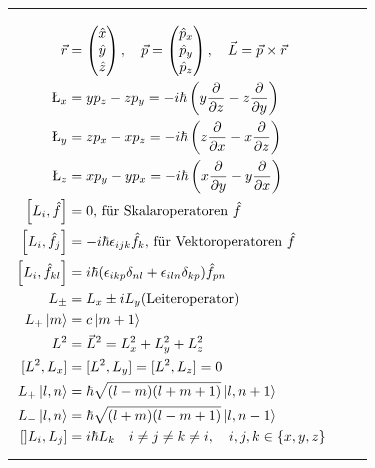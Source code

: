 \documentclass[landscape,8pt]{scrartcl}
\newcommand{\myheading}[1]{\noindent\textbf{#1}\\}
\begin{document}
\begin{tabular}{lll}
\begin{minipage}{0.3\linewidth}
\myheading{Drehimpuls}
{\begin{align*}
\vec r 	&= \begin{pmatrix}\hat x\\\hat y\\\hat z\end{pmatrix},
\quad \vec p 	= \begin{pmatrix}\hat p_x\\\hat p_y\\\hat p_z\end{pmatrix},
\quad \vec L = \vec p \times \vec r \\
%
\L_x 	&= yp_z - zp_y = -i\hbar \left( y\frac{\partial}{\partial z}-z\frac{\partial}{\partial y}\right) \\
%
\L_y 	&= zp_x - xp_z = -i\hbar \left( z\frac{\partial}{\partial x}-x\frac{\partial}{\partial z}\right) \\
%
\L_z 	&= xp_y - yp_x = -i\hbar \left( x\frac{\partial}{\partial y}-y\frac{\partial}{\partial x}\right)\\
\left[L_i,\hat f\right] &= 0 \text{, für Skalaroperatoren $\hat f$} \\
\left[L_i,\hat f_j\right] &= -i\hbar \epsilon_{ijk}\hat f_k \text{, für Vektoroperatoren $\hat f$} \\
\left[L_i,\hat f_{kl}\right] &= i\hbar (\epsilon_{ikp}\delta_{nl}+\epsilon_{iln}\delta_{kp})\hat f_{pn}\\
L_\pm &= L_x \pm i L_y \text {(Leiteroperator)} \\
L_+\ket{m} &= c\ket{m+1} \\
L^2 &= \vec L^2 =  L_x^2+L_y^2+L_z^2 \\
[L^2,L_x] &= [L^2,L_y] = [L^2,L_z] = 0 \\
L_+\ket{l,n} &= \hbar\sqrt{(l-m)(l+m+1)}\ket{l,n+1} \\
L_-\ket{l,n} &= \hbar\sqrt{(l+m)(l-m+1)}\ket{l,n-1} \\
[]L_i,L_j] &= i\hbar L_k\quad i\neq j\neq k\neq i,\quad i,j,k\in\{x,y,z\}\\
\end{align*}}

\end{minipage}
\end{tabular}

\newpage
\end{document}
